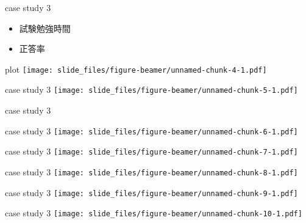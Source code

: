 \documentclass[
  ignorenonframetext,
]{beamer}
\begin{document}
\begin{frame}{case study 3}
\protect\hypertarget{case-study-3-1}{}
\Huge

\begin{itemize}
\item[\textbullet] 試験勉強時間
\item[\textbullet] 正答率
\end{itemize}
\pause
\vspace*{-55pt}
\end{frame}

\begin{frame}{plot}
\protect\hypertarget{plot}{}
\texttt{[image: slide\_files/figure-beamer/unnamed-chunk-4-1.pdf]}
\end{frame}

\begin{frame}{case study 3}
\protect\hypertarget{case-study-3-2}{}
\texttt{[image: slide\_files/figure-beamer/unnamed-chunk-5-1.pdf]}
\end{frame}

\begin{frame}{case study 3}
\protect\hypertarget{case-study-3-3}{}
\end{frame}

\begin{frame}{case study 3}
\protect\hypertarget{case-study-3-4}{}
\texttt{[image: slide\_files/figure-beamer/unnamed-chunk-6-1.pdf]}
\end{frame}

\begin{frame}{case study 3}
\protect\hypertarget{case-study-3-5}{}
\texttt{[image: slide\_files/figure-beamer/unnamed-chunk-7-1.pdf]}
\end{frame}

\begin{frame}{case study 3}
\protect\hypertarget{case-study-3-6}{}
\texttt{[image: slide\_files/figure-beamer/unnamed-chunk-8-1.pdf]}
\end{frame}

\begin{frame}{case study 3}
\protect\hypertarget{case-study-3-7}{}
\texttt{[image: slide\_files/figure-beamer/unnamed-chunk-9-1.pdf]}
\end{frame}

\begin{frame}{case study 3}
\protect\hypertarget{case-study-3-8}{}
\texttt{[image: slide\_files/figure-beamer/unnamed-chunk-10-1.pdf]}
\end{frame}
\end{document}
